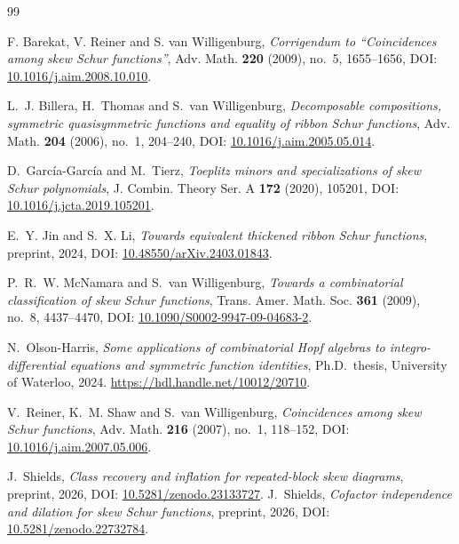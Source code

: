 \documentclass[11pt,a4paper]{amsart}
\numberwithin{equation}{section}
\theoremstyle{plain}
\theoremstyle{definition}
\begin{document}
\begin{thebibliography}{99}

F. Barekat, V. Reiner and S. van Willigenburg,
\emph{Corrigendum to ``Coincidences among skew Schur functions''},
Adv. Math. \textbf{220} (2009), no.~5, 1655--1656,
DOI: \href{https://doi.org/10.1016/j.aim.2008.10.010}{10.1016/\allowbreak j.aim.2008.10.010}.

L.~J. Billera, H.~Thomas and S.~van Willigenburg,
\emph{Decomposable compositions, symmetric quasisymmetric functions and equality of ribbon Schur functions},
Adv. Math. \textbf{204} (2006), no.~1, 204--240,
DOI: \href{https://doi.org/10.1016/j.aim.2005.05.014}{10.1016/\allowbreak j.aim.2005.05.014}.

D.~Garc\'ia-Garc\'ia and M.~Tierz,
\emph{Toeplitz minors and specializations of skew Schur polynomials},
J. Combin. Theory Ser. A \textbf{172} (2020), 105201,
DOI: \href{https://doi.org/10.1016/j.jcta.2019.105201}{10.1016/\allowbreak j.jcta.2019.105201}.

E.~Y. Jin and S.~X. Li,
\emph{Towards equivalent thickened ribbon Schur functions},
preprint, 2024,
DOI: \href{https://doi.org/10.48550/arXiv.2403.01843}{10.48550/\allowbreak arXiv.2403.01843}.

P.~R.~W. McNamara and S.~van Willigenburg,
\emph{Towards a combinatorial classification of skew Schur functions},
Trans. Amer. Math. Soc. \textbf{361} (2009), no.~8, 4437--4470,
DOI: \href{https://doi.org/10.1090/S0002-9947-09-04683-2}{10.1090/\allowbreak S0002-9947-09-04683-2}.

N.~Olson-Harris,
\emph{Some applications of combinatorial Hopf algebras to integro-differential equations and symmetric function identities},
Ph.D.\ thesis, University of Waterloo, 2024.
\url{https://hdl.handle.net/10012/20710}.

V.~Reiner, K.~M. Shaw and S.~van Willigenburg,
\emph{Coincidences among skew Schur functions},
Adv. Math. \textbf{216} (2007), no.~1, 118--152,
DOI: \href{https://doi.org/10.1016/j.aim.2007.05.006}{10.1016/\allowbreak j.aim.2007.05.006}.

J.~Shields,
\emph{Class recovery and inflation for repeated-block skew diagrams},
preprint, 2026,
DOI: \href{https://doi.org/10.5281/zenodo.23133727}{10.5281/\allowbreak zenodo.23133727}.
J.~Shields,
\emph{Cofactor independence and dilation for skew Schur functions},
preprint, 2026,
DOI: \href{https://doi.org/10.5281/zenodo.22732784}{10.5281/\allowbreak zenodo.22732784}.


\end{thebibliography}
\end{document}
